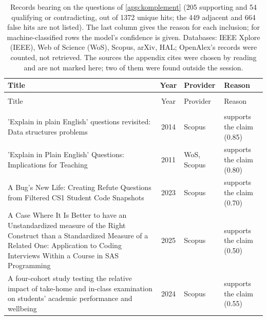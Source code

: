 
\begingroup\footnotesize
\begin{longtable}{@{}%
  >{\raggedright\arraybackslash}p{}c%
  >{\raggedright\arraybackslash}p{}%
  >{\raggedright\arraybackslash}p{}@{}}
\caption{Records bearing on the questions of \cref{app:komplement} (205 supporting and 54 qualifying or contradicting, out of 1372 unique hits; the 449 adjacent and 664 false hits are not listed). The last column gives the reason for each inclusion; for machine-classified rows the model's confidence is given. Databases: IEEE Xplore (IEEE), Web of Science (WoS), Scopus, arXiv, HAL; OpenAlex's records were counted, not retrieved.  The sources the appendix cites were chosen by reading and are not marked here; two of them were found outside the session.}\label{tab:datorprov-komplement}\\
\toprule
Title & Year & Provider & Reason \\
\midrule
\endfirsthead
\multicolumn{4}{@{}l}{\emph{\tablename~\thetable{} (cont.)}}\\
\toprule
Title & Year & Provider & Reason \\
\midrule
\endhead
\midrule \multicolumn{4}{r@{}}{\emph{continued on next page}}\\
\endfoot
\bottomrule
\endlastfoot
'Explain in plain English' questions revisited: Data structures problems & 2014 & Scopus & supports the claim (0.85) \\
'Explain in Plain English' Questions: Implications for Teaching & 2011 & WoS, Scopus & supports the claim (0.80) \\
A Bug's New Life: Creating Refute Questions from Filtered CS1 Student Code Snapshots & 2023 & Scopus & supports the claim (0.70) \\
A Case Where It Is Better to have an Unstandardized measure of the Right Construct than a Standardized Measure of a Related One: Application to Coding Interviews Within a Course in SAS Programming & 2025 & Scopus & supports the claim (0.50) \\
A four-cohort study testing the relative impact of take-home and in-class examination on students' academic performance and wellbeing & 2024 & Scopus & supports the claim (0.55) \\

\end{longtable}
